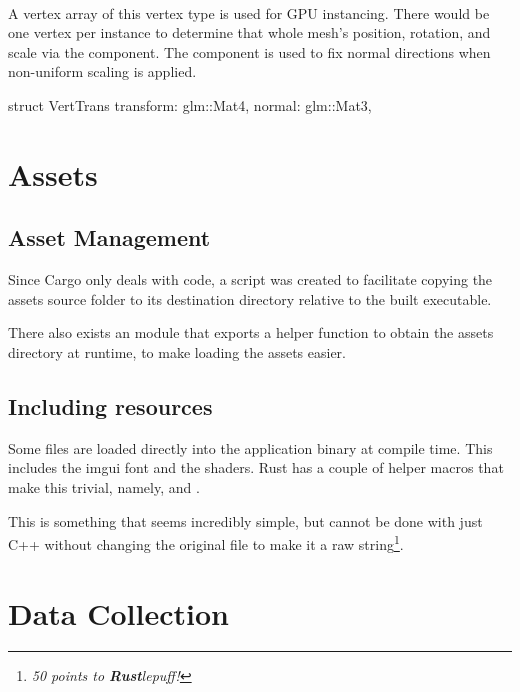 \paragraph{}
A vertex array of this vertex type is used for GPU instancing.
There would be one vertex per instance to determine that whole mesh's position, rotation, and scale via the  component.
The  component is used to fix normal directions when non-uniform scaling is applied.
  \begin{rustcode}
struct VertTrans {
    transform: glm::Mat4,
    normal: glm::Mat3,
}
  \end{rustcode}


\section{Assets}

\subsection{Asset Management}
Since Cargo only deals with code, a  script was created to facilitate copying the assets source folder to its destination directory relative to the built executable.

There also exists an  module that exports a helper function  to obtain the assets directory at runtime, to make loading the assets easier.

\subsection{Including resources}
Some files are loaded directly into the application binary at compile time.
This includes the imgui font and the shaders.
Rust has a couple of helper macros that make this trivial, namely,  and .

This is something that seems incredibly simple, but cannot be done with just C++ without changing the original file to make it a raw string\footnote{\emph{50 points to \textbf{Rust}lepuff!}}.

\section{Data Collection}

